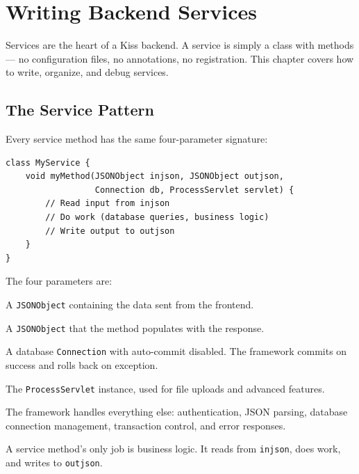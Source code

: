 \chapter{Writing Backend Services}
\label{ch:services}

Services are the heart of a Kiss backend.  A service is simply a class with methods --- no configuration files, no annotations, no registration.  This chapter covers how to write, organize, and debug services.

\section{The Service Pattern}
\label{sec:svc-pattern}

Every service method has the same four-parameter signature:

\begin{lstlisting}[style=groovy]
class MyService {
    void myMethod(JSONObject injson, JSONObject outjson,
                  Connection db, ProcessServlet servlet) {
        // Read input from injson
        // Do work (database queries, business logic)
        // Write output to outjson
    }
}
\end{lstlisting}

\noindent
The four parameters are:

\begin{description}[style=nextline]
  \item[\texttt{injson}] A \texttt{JSONObject} containing the data sent from the frontend.
  \item[\texttt{outjson}] A \texttt{JSONObject} that the method populates with the response.
  \item[\texttt{db}] A database \texttt{Connection} with auto-commit disabled.  The framework commits on success and rolls back on exception.
  \item[\texttt{servlet}] The \texttt{ProcessServlet} instance, used for file uploads and advanced features.
\end{description}

\noindent
The framework handles everything else: authentication, JSON parsing, database connection management, transaction control, and error responses.

\begin{tipbox}
A service method's only job is business logic.  It reads from \texttt{injson}, does work, and writes to \texttt{outjson}.
\end{tipbox}

